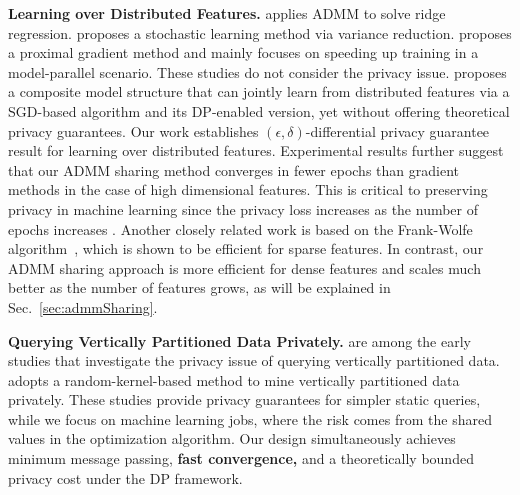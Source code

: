 {\bf Learning over Distributed Features.}
\cite{gratton2018distributed} applies ADMM to solve ridge regression.
\cite{ying2018supervised} proposes a stochastic learning method via variance reduction. \cite{zhou2016convergence} proposes a proximal gradient method and mainly focuses on speeding up training in a model-parallel scenario. These studies do not consider the privacy issue. \cite{hu2019fdml} proposes a composite model structure that can jointly learn from distributed features via a SGD-based algorithm and its DP-enabled version, yet without offering theoretical privacy guarantees. Our work establishes $(\epsilon,\delta)$-differential privacy guarantee result for learning over distributed features. Experimental results further suggest that our ADMM sharing method converges in fewer epochs than gradient methods in the case of high dimensional features. This is critical to preserving privacy in machine learning since the privacy loss increases as the number of epochs increases \cite{dwork2014algorithmic}. Another closely related work is based on the Frank-Wolfe algorithm~\cite{bellet2015distributed,lou2018uplink}, which is shown to be efficient for sparse features. In contrast, our ADMM sharing approach is more efficient for dense features and scales much better as the number of features grows, as will be explained in Sec.~\ref{sec:admmSharing}. %

{\bf Querying Vertically Partitioned Data Privately.} \cite{vaidya2002privacy,dwork2004privacy} are among the early studies that investigate the privacy issue of querying vertically partitioned data. \cite{kenthapadi2013privacy} adopts a random-kernel-based method to mine vertically partitioned data privately. These studies provide privacy guarantees for simpler static queries, while we focus on machine learning jobs, where the risk comes from the shared values in the optimization algorithm. Our design simultaneously achieves minimum message passing, \textbf{fast convergence,} and a theoretically bounded privacy cost under the DP framework.




